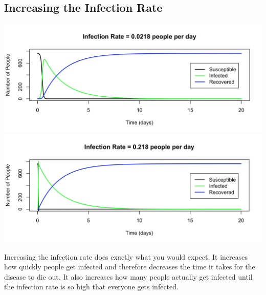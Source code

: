 \documentclass{article}
\begin{document}
    \subsection{Increasing the Infection Rate}
        \includegraphics[width=\textwidth,height=\textheight,keepaspectratio]{sir_infection_00218.png}
        \includegraphics[width=\textwidth,height=\textheight,keepaspectratio]{sir_infection_0218.png}

        Increasing the infection rate does exactly what you would expect. It increases how quickly people get infected and therefore decreases the time it takes for the disease to die out. It also increases how many people actually get infected until the infection rate is so high that everyone gets infected.
\end{document}
